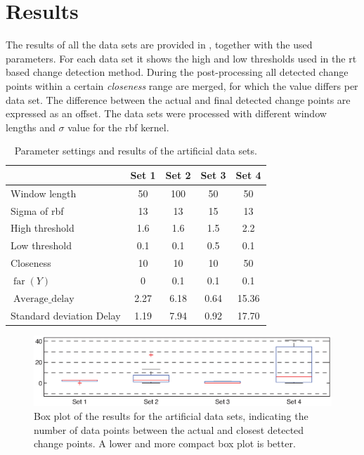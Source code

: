 \section{Results}\label{sec:artificial_data_results}
The results of all the data sets are provided in , together with the used parameters.
For each data set it shows the high and low thresholds used in the \gls{rt} based change detection method.
During the post-processing all detected change points within a certain \emph{closeness} range are merged, for which the value differs per data set.
The difference between the actual and final detected change points are expressed as an offset.
The data sets were processed with different window lengths and $\sigma$ value for the \gls{rbf} kernel.

\begin{table}
  \centering
  \caption[Results artificial data sets]{Parameter settings and results of the artificial data sets.}
  \begin{tabulary}{\textwidth}{|l|c|c|c|c|}
     & Set 1 & Set 2 & Set 3 & Set 4 \\
    \hline
    Window length & 50 & 100 & 50 & 50 \\
    \hline
    Sigma of \gls{rbf} & 13 & 13 & 15 & 13 \\
    \hline
    High threshold & 1.6 & 1.6 & 1.5 & 2.2 \\
    \hline
    Low threshold & 0.1 & 0.1 & 0.5 & 0.1 \\
    \hline
    Closeness & 10 & 10 & 10 & 50 \\
    \hline
    \hline
    $\operatorname*{far}(Y)$ & 0 & 0.1 & 0.1 & 0.1 \\
    \hline
    $\operatorname*{Average\_delay}$ & 2.27 & 6.18 & 0.64 & 15.36 \\
    \hline
    Standard deviation Delay & 1.19 & 7.94 & 0.92 & 17.70 \\
    \hline
  \end{tabulary}
  \label{tab:results_artificial}
\end{table}

\begin{figure}
\centering
  \includegraphics[width=1\textwidth]{./Figures/chapter5/boxplot_results_artificial_sets.eps}
  \caption[Box plot results artificial data sets]{Box plot of the results for the artificial data sets, indicating the number of data points between the actual and closest detected change points. A lower and more compact box plot is better.}
  \label{fig:boxplot_artificial_sets}
\end{figure}

